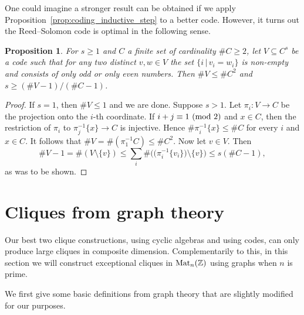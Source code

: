 \documentclass{amsart}
\theoremstyle{plain}
\newtheorem{proposition}[theorem]{Proposition}
\theoremstyle{definition}
\newcommand{\Z}{\ensuremath{\mathbb{Z}}}
\newcommand{\clq}{C}
\begin{document}
One could imagine a stronger result can be obtained if we apply Proposition~\ref{prop:coding_inductive_step} to a better code. However, it turns out the Reed--Solomon code is optimal in the following sense.

\begin{proposition}
	For \(s\geq 1\) and \(\clq\) a finite set of cardinality \(\#\clq\geq 2\), let \(V\subseteq \clq^s\) be a code such that for any two distinct \(v,w\in V\) the set \(\{i\,|\, v_i=w_i\}\) is non-empty and consists of only odd or only even numbers. Then \(\# V\leq \# \clq^2\) and \(s \geq (\# V-1)/(\#\clq-1)\).
\end{proposition}
\begin{proof}
	If \(s = 1\), then \(\# V\leq 1\) and we are done. Suppose \(s>1\). 
	Let \(\pi_i:V\to \clq\) be the projection onto the \(i\)-th coordinate. If \(i+j \equiv 1\ (\textup{mod }2)\) and \(x\in \clq\), then the restriction of \(\pi_i\) to \(\pi_j^{-1}\{x\} \to \clq\) is injective.
	Hence \(\#\pi_i^{-1}\{x\}\leq \#\clq\) for every \(i\) and \(x\in \clq\). It follows that \(\# V= \#(\pi_1^{-1} \clq) \leq \#\clq^2\). Now let \(v\in V\). Then
	\[\#V-1=\# (V\setminus \{v\}) \leq \sum_{i} \# \big((\pi_i^{-1}\{v_i\} \big)\setminus\{v\}\big) \leq s(\# \clq-1),\]
	as was to be shown.
\end{proof}


\section{Cliques from graph theory}\label{sec:graph}

Our best two clique constructions, using cyclic algebras and using codes, can only produce large cliques in composite dimension. 
Complementarily to this, in this section we will construct exceptional cliques in \(\textup{Mat}_n(\Z)\) using graphs when \(n\) is prime.

We first give some basic definitions from graph theory that are slightly modified for our purposes.
\end{document}
